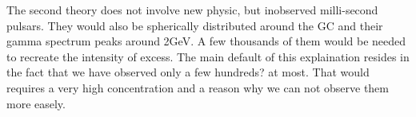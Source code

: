 The second theory does not involve new physic, but inobserved milli-second pulsars. They would also be spherically distributed around the GC and their gamma spectrum peaks around 2GeV. A few thousands of them would be needed to recreate the intensity of excess. The main default of this explaination resides in the fact that we have observed only a few hundreds? at most. That would requires a very high concentration and a reason why we can not observe them more easely.








































